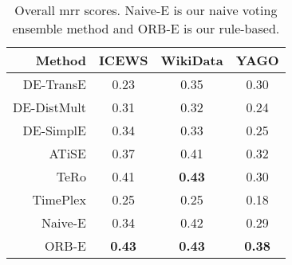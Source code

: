 \begin{table}[htb]
\centering
\begin{minipage}{\columnwidthcaption}
\centering
\caption{Overall \gls{mrr} scores. Naive-E is our naive voting ensemble method and ORB-E is our rule-based.}
\vspace{-3mm}

\begin{tabular}{r|ccc} \hline
Method & {\mbox{ICEWS}} & {WikiData} & {YAGO} \\ \hline
DE-TransE & 0.23 & 0.35 & 0.30 \\
DE-DistMult & 0.31 & 0.32 & 0.24 \\
DE-SimplE & 0.34 & 0.33 & 0.25 \\
ATiSE & 0.37 & 0.41 & 0.32 \\
TeRo & 0.41 & \textbf{0.43} & 0.30 \\
TimePlex & 0.25 & 0.25 & 0.18 \\ \hline
Naive-E & 0.34 & 0.42 & 0.29 \\
ORB-E & \textbf{0.43} & \textbf{0.43} & \textbf{0.38} \\
\hline
\end{tabular}

\label{tab:overall_scores}
\end{minipage}
\end{table}

